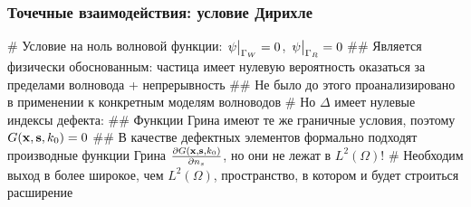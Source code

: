 \documentclass{beamer}
\begin{document}
\begin{frame}[fragile]
\frametitle{Точечные взаимодействия: условие Дирихле}
\begin{easylist}[itemize]
# Условие на ноль волновой функции: $\eval{\psi}_{\Gamma_W} = 0$, $\eval{\psi}_{\Gamma_R} = 0$
## Является физически обоснованным: частица имеет нулевую вероятность оказаться за пределами волновода + непрерывность
## Не было до этого проанализировано в применении к конкретным моделям волноводов
# Но $\Delta$ имеет нулевые индексы дефекта:
## Функции Грина имеют те же граничные условия, поэтому $G(\vb{x}, \vb{s}, k_0) = 0$
## В качестве дефектных элементов формально подходят производные функции Грина $\pdv{G(\vb{x}, \vb{s}, k_0)}{n_s}$, но они не лежат в $L^2(\Omega)$!
# Необходим выход в более широкое, чем $L^2(\Omega)$, пространство, в котором и будет строиться расширение
\end{easylist}
\end{frame}




\end{document}
